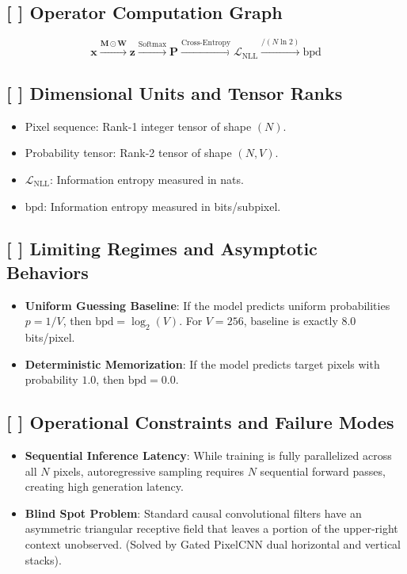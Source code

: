 \documentclass[11pt,a4paper]{article}
\theoremstyle{definition}
\begin{document}
\subsection{[ ] Operator Computation Graph}
{\boldmath
\begin{equation}
\mathbf{x} \xrightarrow{\mathbf{M} \odot \mathbf{W}} \mathbf{z} \xrightarrow{\text{Softmax}} \mathbf{P} \xrightarrow{\text{Cross-Entropy}} \mathcal{L}_{\text{NLL}} \xrightarrow{/ (N \ln 2)} \text{bpd}
\end{equation}
}

\subsection{[ ] Dimensional Units and Tensor Ranks}
\begin{itemize}
    \item Pixel sequence: Rank-1 integer tensor of shape $(N)$.
    \item Probability tensor: Rank-2 tensor of shape $(N, V)$.
    \item $\mathcal{L}_{\text{NLL}}$: Information entropy measured in nats.
    \item $\text{bpd}$: Information entropy measured in bits/subpixel.
\end{itemize}

\subsection{[ ] Limiting Regimes and Asymptotic Behaviors}
\begin{itemize}
    \item \textbf{Uniform Guessing Baseline}: If the model predicts uniform probabilities $p = 1/V$, then $\text{bpd} = \log_2(V)$. For $V = 256$, baseline is exactly $8.0$ bits/pixel.
    \item \textbf{Deterministic Memorization}: If the model predicts target pixels with probability $1.0$, then $\text{bpd} = 0.0$.
\end{itemize}

\subsection{[ ] Operational Constraints and Failure Modes}
\begin{itemize}
    \item \textbf{Sequential Inference Latency}: While training is fully parallelized across all $N$ pixels, autoregressive sampling requires $N$ sequential forward passes, creating high generation latency.
    \item \textbf{Blind Spot Problem}: Standard causal convolutional filters have an asymmetric triangular receptive field that leaves a portion of the upper-right context unobserved. (Solved by Gated PixelCNN dual horizontal and vertical stacks).
\end{itemize}
\end{document}
